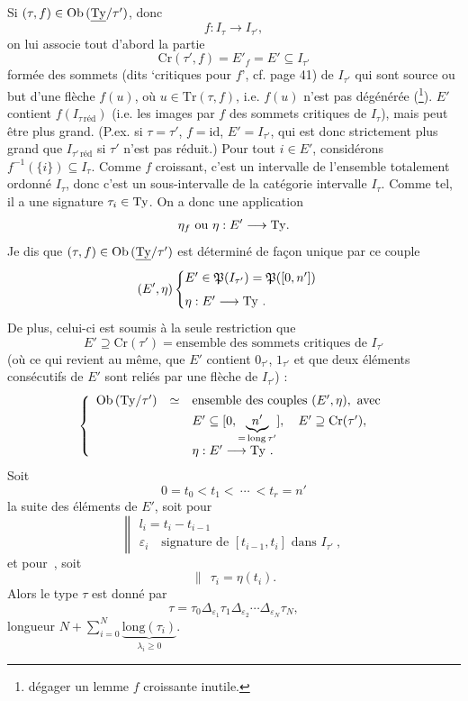 Si $(\tau, f) \in \mathrm{Ob}\,(\underline{\mathrm{Ty}}/\tau')$, donc
\[
f : I_\tau \longrightarrow I_{\tau'},
\]
on lui associe tout d'abord la partie
\[
\mathrm{Cr}(\tau', f) = E'_f = E' \subseteq I_{\tau'}
\]
formée des sommets (dits `critiques pour $f$', cf. page 41) de $I_{\tau'}$ qui sont source ou but d'une flèche $f(u)$, où $u \in \mathrm{Tr}(\tau, f)$, i.e. $f(u)$ n'est pas dégénérée (\footnote[13]{dégager un lemme $f$ croissante inutile.}). $E'$ contient $f(I_{\tau\,\text{réd}})$ (i.e. les images par $f$ des sommets critiques de $I_\tau$),
mais peut être plus grand. (P.ex. si $\tau = \tau'$, $f = \mathrm{id}$, $E' = I_{\tau'}$, qui est donc strictement plus grand que $I_{\tau'\,\text{réd}}$ si $\tau'$ n'est pas réduit.) Pour tout $i \in E'$, considérons $f^{-1}(\{i\}) \subseteq I_\tau$. Comme $f$ croissant, c'est un intervalle de l'ensemble totalement ordonné $I_\tau$, donc c'est un sous-intervalle de la catégorie intervalle $I_\tau$. Comme tel, il a une signature $\tau_i \in \mathrm{Ty}$. On a donc une application
\[
\eta_f \text{ ou } \eta : E' \longrightarrow \mathrm{Ty}.
\]
Je dis que $(\tau, f) \in \mathrm{Ob}\,(\underline{\mathrm{Ty}}/\tau')$ est déterminé de façon unique par ce couple
\[
(E', \eta) \begin{cases} E' \in \mathfrak{P}(I_{\tau'}) = \mathfrak{P}([0,n']) \\[1ex] \eta : E' \longrightarrow \mathrm{Ty}\ . \end{cases}
\]
De plus, celui-ci est soumis à la seule restriction que
\[
E' \supseteq \mathrm{Cr}(\tau') = \text{ensemble des sommets critiques de } I_{\tau'}
\]
(où ce qui revient au même, que $E'$ contient $0_{\tau'}$, $1_{\tau'}$ et que deux éléments consécutifs de $E'$ sont reliés par une flèche de $I_{\tau'}$) : %
\[
\left\{
\begin{array}{lcl}
\mathrm{Ob}\,(\Ty/\tau') & \simeq & \text{ensemble des couples } (E',\eta), \text{ avec} \\[1ex]
 & & E' \subseteq [0, \underbrace{\ n'\ }_{=\,\mathrm{long}\,\tau'}], \quad E' \supseteq \mathrm{Cr}(\tau'), \\[1ex]
 & & \eta : E' \longrightarrow \Ty\ .
\end{array}
\right.
\]
Soit
\[
0 = t_0 < t_1 < \ \cdots\ < t_r = n'
\]
la suite des éléments de $E'$, soit pour 
\[
\left\|
\begin{array}{l}
l_i = t_i - t_{i-1} \\[1ex]
\varepsilon_i \quad \text{signature de } [t_{i-1}, t_i] \text{ dans } I_{\tau'}\ ,
\end{array}
\right.
\]
et pour \,, soit
\[
\|\ \ \tau_i = \eta(t_i).
\]
Alors le type $\tau$ est donné par
\[
\tau = \tau_0 \Delta_{\varepsilon_1} \tau_1 \Delta_{\varepsilon_2} \cdots \Delta_{\varepsilon_N} \tau_N, \tag*{$(*)$}
\]
 longueur $N + \sum_{i=0}^N \underbrace{\mathrm{long}(\tau_i)}_{\lambda_i \geq 0}$.

